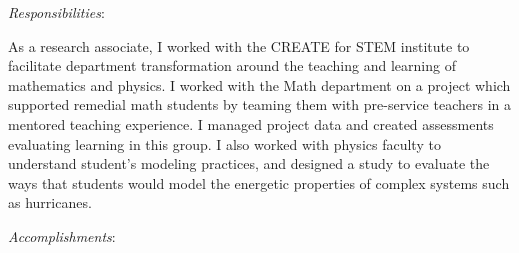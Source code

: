 \vspace{1em}
\textit{Responsibilities}:

As a research associate, I worked with the CREATE for STEM institute to facilitate department
transformation around the teaching and learning of mathematics and physics. I worked with the
Math department on a project which supported remedial math students by teaming them with
pre-service teachers in a mentored teaching experience. I managed project data and created
assessments evaluating learning in this group. I also worked with physics faculty to understand
student's modeling practices, and designed a study to evaluate the ways that students would
model the energetic properties of complex systems such as hurricanes.

\textit{Accomplishments}:

\resumeItemListStart


\resumeItemListEnd
        
\resumeSubHeadingListEnd